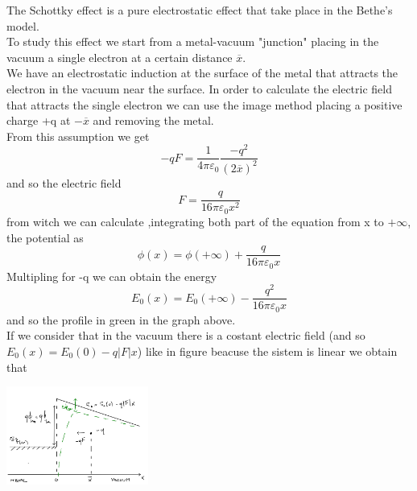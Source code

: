 The Schottky effect is a pure electrostatic effect that take place in the Bethe's model.\\
To study this effect we start from a metal-vacuum "junction" placing in the vacuum a single electron at a certain distance $\overline{x}$.\\
We have an electrostatic induction at the surface of the metal that attracts the electron in the vacuum near the surface. In order to calculate the electric field that attracts the single electron we can use the image method placing a positive charge +q at $-\overline{x}$ and removing the metal.\\
From this assumption we get 
\begin{equation}
-qF=\frac{1}{4\pi \varepsilon_0} \frac{-q^2}{(2\overline{x})^2}
\end{equation}
and so the electric field 
\begin{equation}
F=\frac{q}{16\pi\varepsilon_0x^2}
\end{equation}
from witch we can calculate ,integrating both part of the equation from x to $+\infty$, the potential as
\begin{equation}
\phi(x)=\phi(+\infty)+\frac{q}{16\pi \varepsilon_0 x}
\end{equation}
Multipling for -q we can obtain the energy 
\begin{equation}
E_0(x)=E_0(+\infty)-\frac{q^2}{16 \pi \varepsilon_0 x}
\end{equation}
and so the profile in green in the graph above.\\
\vspace{5mm}
If we consider that in the vacuum there is a costant electric field (and so $E_0(x)=E_0(0)-q|F|x$) like in figure beacuse the sistem is linear we obtain that

\centering
\includegraphics[width=0.35\textwidth]{deltaphibn.png}\\
\raggedright


